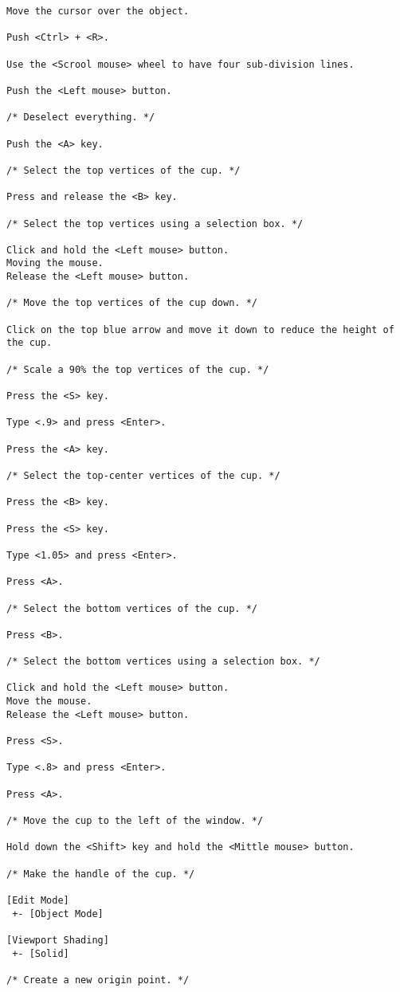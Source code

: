 \begin{verbatim}
Move the cursor over the object.

Push <Ctrl> + <R>.

Use the <Scrool mouse> wheel to have four sub-division lines.

Push the <Left mouse> button.

/* Deselect everything. */

Push the <A> key.

/* Select the top vertices of the cup. */

Press and release the <B> key.

/* Select the top vertices using a selection box. */

Click and hold the <Left mouse> button.
Moving the mouse.
Release the <Left mouse> button.

/* Move the top vertices of the cup down. */

Click on the top blue arrow and move it down to reduce the height of
the cup.

/* Scale a 90% the top vertices of the cup. */

Press the <S> key.

Type <.9> and press <Enter>.

Press the <A> key.

/* Select the top-center vertices of the cup. */

Press the <B> key.

Press the <S> key.

Type <1.05> and press <Enter>.

Press <A>.

/* Select the bottom vertices of the cup. */

Press <B>.

/* Select the bottom vertices using a selection box. */

Click and hold the <Left mouse> button.
Move the mouse.
Release the <Left mouse> button.

Press <S>.

Type <.8> and press <Enter>.

Press <A>.

/* Move the cup to the left of the window. */

Hold down the <Shift> key and hold the <Mittle mouse> button.

/* Make the handle of the cup. */

[Edit Mode]
 +- [Object Mode]

[Viewport Shading]
 +- [Solid]

/* Create a new origin point. */


\end{verbatim}
